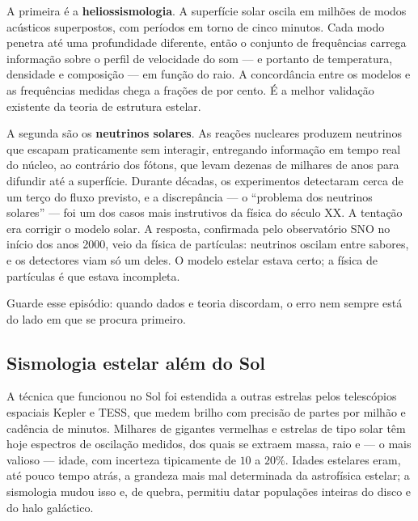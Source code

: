\documentclass[11pt,a4paper]{article}
\begin{document}
A primeira é a \textbf{heliossismologia}. A superfície solar oscila em milhões de modos acústicos superpostos, com períodos em torno de cinco minutos. Cada modo penetra até uma profundidade diferente, então o conjunto de frequências carrega informação sobre o perfil de velocidade do som --- e portanto de temperatura, densidade e composição --- em função do raio. A concordância entre os modelos e as frequências medidas chega a frações de por cento. É a melhor validação existente da teoria de estrutura estelar.

A segunda são os \textbf{neutrinos solares}. As reações nucleares produzem neutrinos que escapam praticamente sem interagir, entregando informação em tempo real do núcleo, ao contrário dos fótons, que levam dezenas de milhares de anos para difundir até a superfície. Durante décadas, os experimentos detectaram cerca de um terço do fluxo previsto, e a discrepância --- o ``problema dos neutrinos solares'' --- foi um dos casos mais instrutivos da física do século XX. A tentação era corrigir o modelo solar. A resposta, confirmada pelo observatório SNO no início dos anos 2000, veio da física de partículas: neutrinos oscilam entre sabores, e os detectores viam só um deles. O modelo estelar estava certo; a física de partículas é que estava incompleta.

Guarde esse episódio: quando dados e teoria discordam, o erro nem sempre está do lado em que se procura primeiro.

\subsection*{Sismologia estelar além do Sol}

A técnica que funcionou no Sol foi estendida a outras estrelas pelos telescópios espaciais Kepler e TESS, que medem brilho com precisão de partes por milhão e cadência de minutos. Milhares de gigantes vermelhas e estrelas de tipo solar têm hoje espectros de oscilação medidos, dos quais se extraem massa, raio e --- o mais valioso --- idade, com incerteza tipicamente de $10$ a $20\%$. Idades estelares eram, até pouco tempo atrás, a grandeza mais mal determinada da astrofísica estelar; a sismologia mudou isso e, de quebra, permitiu datar populações inteiras do disco e do halo galáctico.
\end{document}
